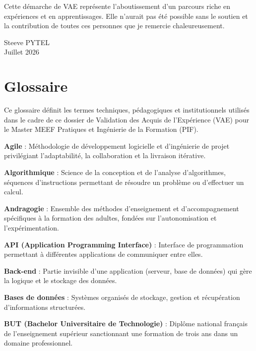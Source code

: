 \documentclass[12pt,a4paper]{report}
\begin{document}
{\vspace{0.2cm}

Cette démarche de VAE représente l'aboutissement d'un parcours riche en expériences et en apprentissages. Elle n'aurait pas été possible sans le soutien et la contribution de toutes ces personnes que je remercie chaleureusement.

\vspace{0.2cm}

\begin{flushright}
Steeve PYTEL\\
Juillet 2026
\end{flushright}
}

\newpage


\chapter*{Glossaire}

Ce glossaire définit les termes techniques, pédagogiques et institutionnels utilisés dans le cadre de ce dossier de Validation des Acquis de l'Expérience (VAE) pour le Master MEEF Pratiques et Ingénierie de la Formation (PIF).

\begin{tcolorbox}[colback=white,colframe=headercolor,title=\textbf{A},fonttitle=\large\bfseries]
\textbf{Agile} : Méthodologie de développement logicielle et d'ingénierie de projet privilégiant l'adaptabilité, la collaboration et la livraison itérative.

\textbf{Algorithmique} : Science de la conception et de l'analyse d'algorithmes, séquences d'instructions permettant de résoudre un problème ou d'effectuer un calcul.

\textbf{Andragogie} : Ensemble des méthodes d'enseignement et d'accompagnement spécifiques à la formation des adultes, fondées sur l'autonomisation et l'expérimentation.

\textbf{API (Application Programming Interface)} : Interface de programmation permettant à différentes applications de communiquer entre elles.
\end{tcolorbox}

\begin{tcolorbox}[colback=white,colframe=headercolor,title=\textbf{B},fonttitle=\large\bfseries]
\textbf{Back-end} : Partie invisible d'une application (serveur, base de données) qui gère la logique et le stockage des données.

\textbf{Bases de données} : Systèmes organisés de stockage, gestion et récupération d'informations structurées.

\textbf{BUT (Bachelor Universitaire de Technologie)} : Diplôme national français de l'enseignement supérieur sanctionnant une formation de trois ans dans un domaine professionnel.
\end{tcolorbox}
\end{document}
